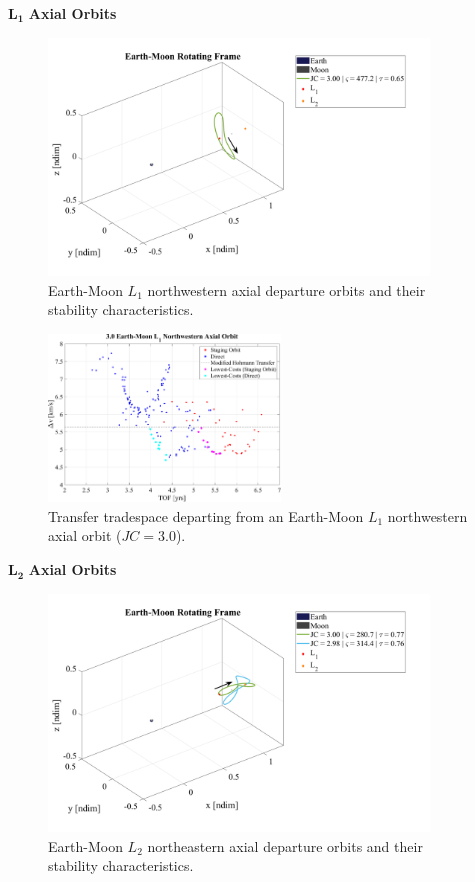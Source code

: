 $\pmb{L_{1}}$ \textbf{Axial Orbits}
\begin{figure}[ht]
    \centering
    \includegraphics[width=0.9\textwidth]{figures/L1AxialDepartureOrbits.pdf}
    \caption{Earth-Moon $L_{1}$ northwestern axial departure orbits and their stability characteristics.}
\end{figure}

\begin{figure}[ht]
    \centering
    \includegraphics[width=0.55\textwidth]{figures/TradeSpace_L1Axial_3_00.pdf}
    \caption{Transfer tradespace departing from an Earth-Moon $L_{1}$ northwestern axial orbit ($JC=3.0$).}
\end{figure}
\clearpage

$\pmb{L_{2}}$ \textbf{Axial Orbits}
\begin{figure}[ht]
    \centering
    \includegraphics[width=0.9\textwidth]{figures/L2AxialDepartureOrbits.pdf}
    \caption{Earth-Moon $L_{2}$ northeastern axial departure orbits and their stability characteristics.}
\end{figure}

